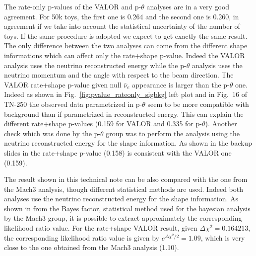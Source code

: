 The rate-only p-values of the VALOR and p-$\theta$ analyses are in a very good agreement.
For 50k toys, the first one is 0.264 and the second one is 0.260, in agreement if we take into
account the statistical uncertainty of the number of toys.
If the same procedure is adopted we expect to get exactly the same result.
The only difference between the two analyses can come from the different shape informations
which can affect only the rate+shape p-value. 
Indeed the VALOR analysis uses the neutrino reconstructed energy while the p-$\theta$ analysis
uses the neutrino momentum and the angle with respect to the beam direction.
The VALOR rate+shape p-value given null $\bar{\nu}_e$ appearance is larger than the p-$\theta$ one. 
Indeed as shown in Fig.~\ref{fig:pvalue_rateonly_sigbkg} left plot and in Fig.~16 of TN-250 the observed data
parametrized in p-$\theta$ seem to be more compatible with background than if 
parametrized in reconstructed energy. 
This can explain the different rate+shape p-values (0.159 for VALOR and 0.335 for p-$\theta$).
Another check which was done by the p-$\theta$ group was to perform the analysis using the 
neutrino reconstructed energy for the shape information.
As shown in the backup slides in \cite{pthetaComparisonEreco} the rate+shape p-value (0.158) is 
consistent with the VALOR one (0.159). 

The result shown in this technical note can be also compared with the one from the Mach3 analysis, though different statistical methods are used.
Indeed both analyses use the neutrino reconstructed energy for the shape information.
As shown in \cite{Mach3ComparisonBayesFactor} from the Bayes factor, statistical method used for the bayesian
analysis by the Mach3 group, it is possible to extract approximately the corresponding likelihood ratio value.
For the rate+shape VALOR result, given $\Delta \chi^2 = 0.164213$, the corresponding likelihood ratio value is given by $e^{\Delta \chi^2 / 2} = 1.09$, 
which is very close to the one obtained from the Mach3 analysis (1.10).


